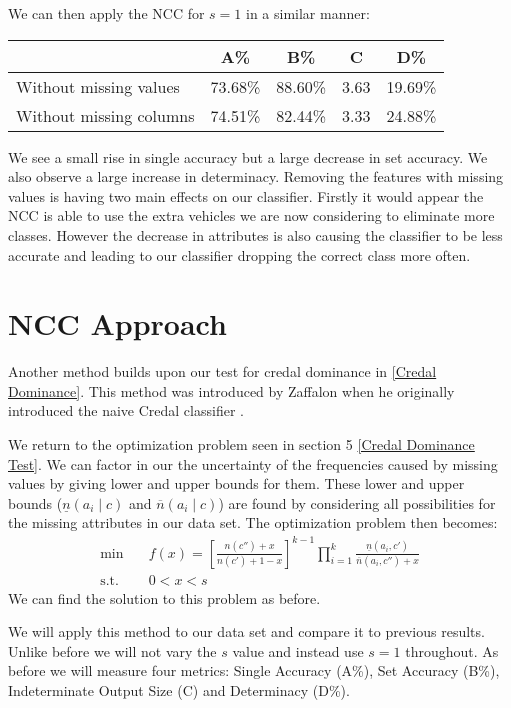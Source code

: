 We can then apply the NCC for $s=1$ in a similar manner:
\begin{center}
\begin{tabular}{l|c c c c}
	                        &   A\%   &   B\%   &  C   &   D\%   \\
	\hline
	Without missing values  & 73.68\% & 88.60\% & 3.63 & 19.69\% \\
	Without missing columns & 74.51\% & 82.44\% & 3.33 & 24.88\% \\
\end{tabular}
\end{center}

We see a small rise in single accuracy but a large decrease in set accuracy.
We also observe a large increase in determinacy.
Removing the features with missing values is having two main effects on our classifier.
Firstly it would appear the NCC is able to use the extra vehicles we are now considering to eliminate more classes.
However the decrease in attributes is also causing the classifier to be less accurate and leading to our classifier dropping the correct class more often.

\section{NCC Approach}

Another method builds upon our test for credal dominance in \cref{Credal Dominance}.
This method was introduced by Zaffalon when he originally introduced the naive Credal classifier \cite{Zaffalon01}.

We return to the optimization problem seen in section 5 \cref{Credal Dominance Test}.
We can factor in our the uncertainty of the frequencies caused by missing values by giving lower and upper bounds for them.
These lower and upper bounds ($\underline{n}(a_i \mid c)$ and $\overline{n}(a_i \mid c)$) are found by considering all possibilities for the missing attributes in our data set.
The optimization problem then becomes:
\begin{align}
	\min \quad & f(x) = \left[ \frac{n(c'') + x}{n(c') + 1 - x} \right]^{k-1} \prod_{i=1}^k \frac{\underline{n}(a_i, c')}{\overline{n}(a_i, c'') + x} \\
	\text{s.t.} \quad & 0 < x < s
\end{align}
We can find the solution to this problem as before.

We will apply this method to our data set and compare it to previous results.
Unlike before we will not vary the $s$ value and instead use $s=1$ throughout.
As before we will measure four metrics: Single Accuracy (A\%), Set Accuracy (B\%), Indeterminate Output Size (C) and Determinacy (D\%).

